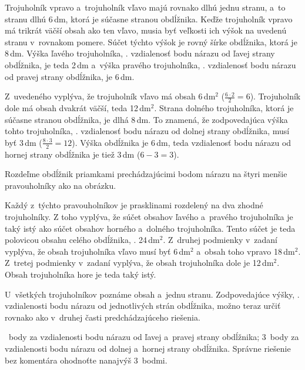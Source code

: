 {%
Trojuholník vpravo a~trojuholník vľavo majú rovnako dlhú jednu stranu,
a~to stranu dlhú 6\,dm, ktorá je súčasne stranou obdĺžnika.
Keďže trojuholník vpravo má trikrát väčší obsah ako ten vľavo, musia byť
veľkosti ich výšok na uvedenú stranu v~rovnakom pomere.
Súčet týchto výšok je rovný šírke obdĺžnika, ktorá je 8\,dm.
Výška ľavého trojuholníka, \tj. vzdialenosť bodu nárazu od ľavej strany
obdĺžnika, je teda 2\,dm a~výška pravého trojuholníka, \tj. vzdialenosť bodu
nárazu od pravej strany obdĺžnika, je 6\,dm.

Z~uvedeného vyplýva, že trojuholník vľavo má obsah 6\,dm$^2$
($\frac{6\cdot2}2=6$).
Trojuholník dole má obsah dvakrát väčší, teda 12\,dm$^2$.
Strana dolného trojuholníka, ktorá je súčasne stranou obdĺžnika, je dlhá
8\,dm.
To znamená, že zodpovedajúca výška tohto trojuholníka,
\tj. vzdialenosť bodu nárazu od dolnej strany obdĺžnika, musí byť 3\,dm
($\frac{8\cdot3}2=12$).
Výška obdĺžnika je 6\,dm, teda vzdialenosť bodu nárazu od hornej strany
obdĺžnika je tiež 3\,dm ($6-3=3$).
%

\ineriesenie
Rozdeľme obdĺžnik priamkami prechádzajúcimi bodom nárazu
na štyri menšie pravouholníky ako na obrázku.
%

Každý z~týchto pravouholníkov je prasklinami rozdelený na dva zhodné
trojuholníky.
Z toho vyplýva, že súčet obsahov ľavého a~pravého trojuholníka
je taký istý ako súčet obsahov horného a~dolného trojuholníka.
Tento súčet je teda polovicou obsahu celého obdĺžnika, \tj. 24\,dm$^2$.
Z~druhej podmienky v~zadaní vyplýva, že
obsah trojuholníka vľavo musí byť 6\,dm$^2$ a~obsah toho vpravo 18\,dm$^2$.
Z~tretej podmienky v~zadaní vyplýva, že obsah trojuholníka dole je 12\,dm$^2$.
Obsah trojuholníka hore je teda taký istý.

U~všetkých trojuholníkov poznáme obsah a~jednu stranu.
Zodpovedajúce výšky, \tj. vzdialenosti bodu nárazu od jednotlivých
strán obdĺžnika, možno teraz určiť rovnako ako v~druhej časti predchádzajúceho
riešenia.

~body za vzdialenosti bodu nárazu od ľavej a~pravej strany obdĺžnika;
3~body za vzdialenosti bodu nárazu od dolnej a~hornej strany obdĺžnika.
Správne riešenie bez komentára ohodnoťte nanajvýš 3~bodmi.
\endhodnotenie
}

